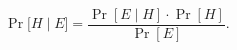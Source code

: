 \documentclass[preview, border={0pt 2pt 1pt 1pt}, varwidth=7.5cm]{standalone} %
\begin{document}
    \raggedright
    \[
        {\Pr}\big[H \mid E \big] = \frac{\Pr[E \mid H] \cdot \Pr[H]}{\Pr[E]}.
    \]



    












\end{document}
